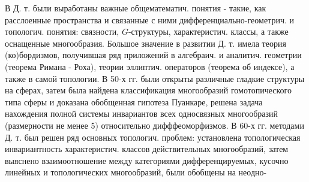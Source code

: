 \documentclass[10pt]{article}
\begin{document}
В Д. т. были выработаны важные общематематич. понятия - такие, как расслоенные пространства и связанные с ними дифференциально-геометрич. и топологич. понятия: связности, $G$-структуры, характеристич. классы, а также оснащенные многообразия. Большое значение в развитии Д. т. имела теория (ко)бордизмов, получившая ряд приложений в алгебраич. и аналитич. геометрии (теорема Римана - Роха), теории эллиптич. операторов (теорема об индексе), а также в самой топологии. В 50-х гг. были открыты различные гладкие структуры на сферах, затем была найдена классификация многообразий гомотопического типа сферы и доказана обобщенная гипотеза Пуанкаре, решена задача нахождения полной системы инвариантов всех односвязных многообразий (размерности не менее 5) относительно дифффеоморфизмов. В 60-х гг. методами Д. т. был решен ряд основных топологич. проблем: установлена топологическая инвариантность характеристич. классов действительных многообразий, затем выяснено взаимоотношение между категориями дифференцируемых, кусочно линейных и топологических многообразий, были обобщены на неодно-
\end{document}

